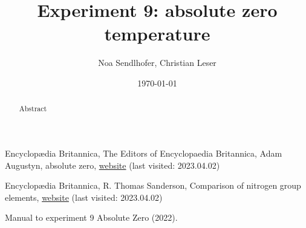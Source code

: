 \documentclass[12pt,a4paper]{article}
\title{Experiment 9: absolute zero temperature}
\author{Noa Sendlhofer, Christian Leser}
\date{\today}
\begin{document}
\maketitle

\begin{abstract}
    Abstract
\end{abstract}

\tableofcontents





\newpage










\begin{thebibliography}{99}

Encyclop\ae dia Britannica, The Editors of Encyclopaedia Britannica, Adam Augustyn, absolute zero, \href{https://www.britannica.com/science/absolute-zero}{website} (last visited: 2023.04.02)

Encyclop\ae dia Britannica, R. Thomas Sanderson, Comparison of nitrogen group elements, \href{https://www.britannica.com/science/nitrogen-group-element/Comparison-of-nitrogen-group-elements}{website} (last visited: 2023.04.02)

Manual to experiment 9 Absolute Zero (2022).


\end{thebibliography}
\end{document}
